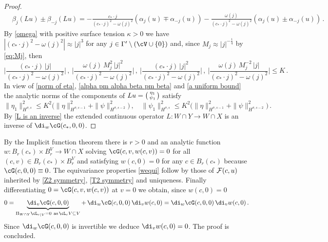 \documentclass[11pt,a4paper,reqno]{article}
\numberwithin{equation}{section}
\theoremstyle{definition}
\begin{document}
\begin{appendix}
\begin{proof}
\begin{equation}
\begin{aligned}
                &\beta_j(Lu)\pm \beta_{-j}(Lu)=
                    -\tfrac{c_*\cdot j}{(c_*\cdot j)^2-\omega(j)^2}(\alpha_j(u) \mp \alpha_{-j}(u))
                    -\tfrac{\omega(j)}{(c_*\cdot j)^2-\omega(j)^2}(\alpha_j(u) \pm \alpha_{-j}(u)) \, . 
           \end{aligned}
       \end{equation}
By \eqref{omega}  with positive surface tension $ \kappa > 0 $ we have
$           |(c_*\cdot j)^2-\omega(j)^2| \approx |j|^{3} $ 
for any $ j \in \Gamma'\setminus(\cV\cup\{0\}) $
    and, since $
            M_j \approx |j|^{-\frac 14} $ by  \eqref{eq:Mj},   
            then 
        \begin{equation}\label{a uniform bound}
            \Big|\frac{(c_*\cdot j)\, | j|}{(c_*\cdot j)^2-\omega(j)^2}\Big|\, , \
            \Big|\frac{\omega(j)\, M_j^2\,  | j|^2}{(c_*\cdot j)^2-\omega(j)^2}\Big|\, , \
            \Big|\frac{(c_*\cdot j)\,  | j|^2}{(c_*\cdot j)^2-\omega(j)^2}\Big|
            \, , \
            \Big|\frac{\omega(j)\, M_j^{-2}\,  | j|}{(c_*\cdot j)^2-\omega(j)^2}\Big|\leq K\, .
        \end{equation} 
        In view of  \eqref{norm of eta}, \eqref{alpha  pm alpha beta pm beta} and \eqref{a uniform bound} the analytic norms of the components of
        $ Lu = \begin{psmallmatrix}
            \eta_1\\
            \psi_1
        \end{psmallmatrix} $ satisfy 
        \[
                \|\eta_1\|^2_{H^{\sigma,s}}\leq K^2\big(\|\eta\|_{H^{\sigma,s-1}}^2+\|\psi\|_{H^{\sigma,s-2}}^2\big)\, , \quad 
                \|\psi_1\|^2_{H^{\sigma,s}}\leq K^2\big(\|\eta\|_{H^{\sigma,s-1}}^2+\|\psi\|_{H^{\sigma,s-2}}^2\big) \, . 
        \]
By \eqref{L is an inverse}
the extended continuous operator $ L : W\cap Y\to W\cap X $ 
    is an inverse of $ \di_w\cG(c_*,0,0)$. 
    \end{proof}
    
By  the Implicit function theorem there is $r>0$ and an analytic function $w:B_{r}(c_*)\times B_{r}^V\to W\cap X$ solving 
    $ 
        \cG(c,v,w(c,v))=0 $ for all 
        $ (c,v)\in B_{r}(c_*)\times B^V_r $
        and satisfying 
    $w(c,0)=0$ for any $c\in B_{r}(c_*)$
    because  $\cG(c,0,0) \equiv 0$. The equivariance properties \eqref{wequi} follow by 
those of $ {\cal F }(c, u) $ inherited by 
\eqref{Z2 symmetry}, \eqref{T2 symmetry} and 
uniqueness. Finally differentiating $ 0 = \cG(c,v,w(c,v)) $ 
at $ v = 0 $ we obtain, since $ w(c,0) = 0 $
    $$
    0 = \underbrace{\di_v\cG(c,0,0)}_{\Pi_{W\cap Y} {\cL_c}_{|V} = 0 \ \text{as} \, \cL_cV\subseteq V } + \, \di_w\cG(c,0,0) \, \di_v w(c,0) = \di_w\cG(c,0,0) \, \di_v w(c,0) \, .
    $$
    Since $\di_w\cG(c,0,0)$ is invertible we deduce $\di_v w(c,0)=0$.
    The proof is concluded.
    \end{appendix}
\end{document}
